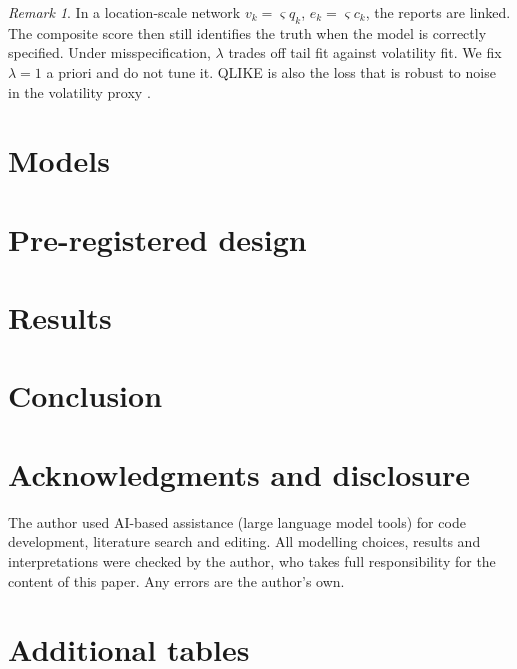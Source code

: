 \documentclass[11pt]{article}
\theoremstyle{remark}
\newtheorem{remark}{Remark}
\newcommand{\1}{\mathbf{1}}
\begin{document}
\begin{remark}
In a location-scale network $v_k=\varsigma q_k$, $e_k=\varsigma c_k$, the reports are linked. The composite score then still identifies the truth when the model is correctly specified. Under misspecification, $\lambda$ trades off tail fit against volatility fit. We fix $\lambda=1$ a priori and do not tune it. QLIKE is also the loss that is robust to noise in the volatility proxy \citep{patton2011volatility}.
\end{remark}

\section{Models}\label{sec:models}


\section{Pre-registered design}\label{sec:design}


\section{Results}\label{sec:results}


\section{Conclusion}\label{sec:conclusion}


\section*{Acknowledgments and disclosure}
The author used AI-based assistance (large language model tools) for code development, literature search and editing. All modelling choices, results and interpretations were checked by the author, who takes full responsibility for the content of this paper. Any errors are the author's own.




\appendix
\section{Additional tables}




\end{document}
